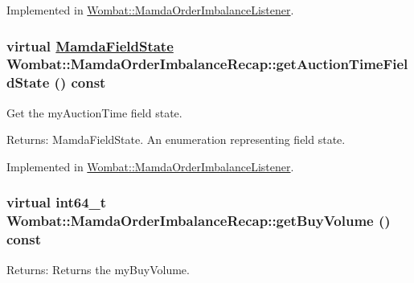 Implemented in \hyperlink{classWombat_1_1MamdaOrderImbalanceListener_ce6a5772582fd4c526fbce36f1edee13}{Wombat::Mamda\-Order\-Imbalance\-Listener}.\hypertarget{classWombat_1_1MamdaOrderImbalanceRecap_bb7f149026c917f1a04059c7bf2cc22f}{
\subsubsection[getAuctionTimeFieldState]{\setlength{\rightskip}{0pt plus 5cm}virtual \hyperlink{namespaceWombat_93aac974f2ab713554fd12a1fa3b7d2a}{Mamda\-Field\-State} Wombat::Mamda\-Order\-Imbalance\-Recap::get\-Auction\-Time\-Field\-State () const}}
\label{classWombat_1_1MamdaOrderImbalanceRecap_bb7f149026c917f1a04059c7bf2cc22f}


Get the my\-Auction\-Time field state. 

\begin{Desc}
\item[Returns:]Mamda\-Field\-State. An enumeration representing field state. \end{Desc}


Implemented in \hyperlink{classWombat_1_1MamdaOrderImbalanceListener_34beab82ba1bcb31a0a67df3fd9fa4bd}{Wombat::Mamda\-Order\-Imbalance\-Listener}.\hypertarget{classWombat_1_1MamdaOrderImbalanceRecap_f5d0601b43944ff04a80d98601a041da}{
\subsubsection[getBuyVolume]{\setlength{\rightskip}{0pt plus 5cm}virtual int64\_\-t Wombat::Mamda\-Order\-Imbalance\-Recap::get\-Buy\-Volume () const}}
\label{classWombat_1_1MamdaOrderImbalanceRecap_f5d0601b43944ff04a80d98601a041da}


\begin{Desc}
\item[Returns:]Returns the my\-Buy\-Volume. \end{Desc}


